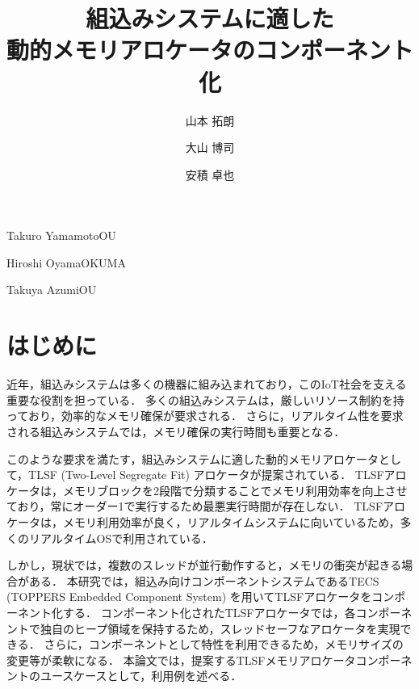 \documentclass[submit]{ipsj_v2/UTF8/ipsj}
\begin{document}
\title{組込みシステムに適した\\動的メモリアロケータのコンポーネント化}




\author{山本 拓朗}{Takuro Yamamoto}{OU}%
\author{大山 博司}{Hiroshi Oyama}{OKUMA}%
\author{安積 卓也}{Takuya Azumi}{OU}%

\maketitle

\section{はじめに}
近年，組込みシステムは多くの機器に組み込まれており，このIoT社会を支える重要な役割を担っている．
多くの組込みシステムは，厳しいリソース制約を持っており，効率的なメモリ確保が要求される．
さらに，リアルタイム性を要求される組込みシステムでは，メモリ確保の実行時間も重要となる．

このような要求を満たす，組込みシステムに適した動的メモリアロケータとして，TLSF (Two-Level Segregate Fit) アロケータが提案されている．
TLSFアロケータは，メモリブロックを2段階で分類することでメモリ利用効率を向上させており，常にオーダー1で実行するため最悪実行時間が存在しない．
TLSFアロケータは，メモリ利用効率が良く，リアルタイムシステムに向いているため，多くのリアルタイムOSで利用されている．

しかし，現状では，複数のスレッドが並行動作すると，メモリの衝突が起きる場合がある．
本研究では，組込み向けコンポーネントシステムであるTECS (TOPPERS Embedded Component System) を用いてTLSFアロケータをコンポーネント化する．
コンポーネント化されたTLSFアロケータでは，各コンポーネントで独自のヒープ領域を保持するため，スレッドセーフなアロケータを実現できる．
さらに，コンポーネントとして特性を利用できるため，メモリサイズの変更等が柔軟になる．
本論文では，提案するTLSFメモリアロケータコンポーネントのユースケースとして，利用例を述べる．

%
\end{document}
